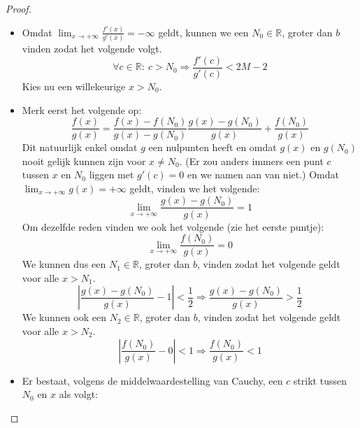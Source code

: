 \documentclass[main.tex]{subfiles}
\begin{document}
\begin{st}
\begin{proof}
\begin{itemize}
\begin{itemize}
      \item Omdat $\lim_{x \rightarrow +\infty}\frac{f'(x)}{g'(x)} = -\infty$ geldt, kunnen we een $N_{0} \in \mathbb{R}$, groter dan $b$ vinden zodat het volgende volgt.
        \[ \forall c\in \mathbb{R}:\ c > N_{0} \Rightarrow \frac{f'(c)}{g'(c)} < 2M-2 \]
        Kies nu een willekeurige $x > N_{0}$.
        \begin{figure}[H]
          \centering
        \end{figure}
      \item 
        Merk eerst het volgende op:
        \[ \frac{f(x)}{g(x)} = \frac{f(x)-f(N_{0})}{g(x)-g(N_{0})}  \frac{g(x)-g(N_{0})}{g(x)} + \frac{f(N_{0})}{g(x)} \]
        Dit natuurlijk enkel omdat $g$ een nulpunten heeft en omdat $g(x)$ en $g(N_{0})$ nooit gelijk kunnen zijn voor $x \neq N_{0}$.
        (Er zou anders immers een punt $c$ tussen $x$ en $N_{0}$ liggen met $g'(c) =0$ en we namen aan van niet.)
        Omdat $\lim_{x\rightarrow +\infty}g(x) = +\infty$ geldt, vinden we het volgende:
        \[ \lim_{x\rightarrow +\infty}\frac{g(x)-g(N_{0})}{g(x)} = 1\]
        Om dezelfde reden vinden we ook het volgende (zie het eerste puntje):
        \[ \lim_{x\rightarrow +\infty}\frac{f(N_{0})}{g(x)} = 0 \]
        We kunnen dus een $N_{1}\in \mathbb{R}$, groter dan $b$, vinden zodat het volgende geldt voor alle $x>N_{1}$.
        \[ \left| \frac{g(x)-g(N_{0})}{g(x)} -1 \right| < \frac{1}{2}  \Rightarrow \frac{g(x)-g(N_{0})}{g(x)} > \frac{1}{2} \]
        We kunnen ook een $N_{2}\in \mathbb{R}$, groter dan $b$, vinden zodat het volgende geldt voor alle $x>N_{2}$.
        \[ \left| \frac{f(N_{0})}{g(x)} -0 \right| < 1 \Rightarrow \frac{f(N_{0})}{g(x)} < 1 \]
      \item 
        Er bestaat, volgens de middelwaardestelling van Cauchy, een $c$ strikt tussen $N_{0}$ en $x$ als volgt:

\end{itemize}
\end{itemize}
\end{proof}
\end{st}
\end{document}
